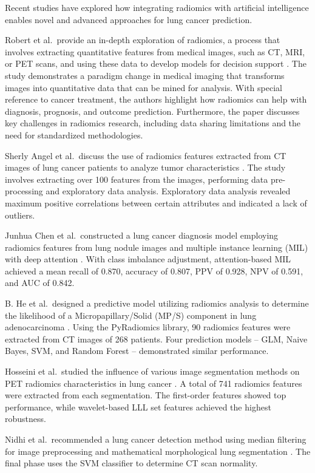 \documentclass{iopjournal}
\begin{document}
Recent studies have explored how integrating radiomics with artificial
intelligence enables novel and advanced approaches for lung cancer
prediction.

Robert et al.\ provide an in-depth exploration of radiomics, a process that
involves extracting quantitative features from medical images, such as CT, MRI,
or PET scans, and using these data to develop models for decision
support \cite{gillies2016radiomics}. The study demonstrates a paradigm change
in medical imaging that transforms images into quantitative data that can be
mined for analysis. With special reference to cancer treatment, the authors
highlight how radiomics can help with diagnosis, prognosis, and outcome
prediction. Furthermore, the paper discusses key challenges in radiomics
research, including data sharing limitations and the need for standardized
methodologies.

Sherly Angel et al.\ discuss the use of radiomics features extracted from CT
images of lung cancer patients to analyze tumor
characteristics \cite{nishanimath2021radiomics}. The study involves extracting
over 100 features from the images, performing data pre-processing and
exploratory data analysis. Exploratory data analysis revealed maximum positive
correlations between certain attributes and indicated a lack of outliers.

Junhua Chen et al.\ constructed a lung cancer diagnosis model employing
radiomics features from lung nodule images and multiple instance learning (MIL)
with deep attention \cite{chen2022lung}. With class imbalance adjustment,
attention-based MIL achieved a mean recall of 0.870, accuracy of 0.807, PPV of
0.928, NPV of 0.591, and AUC of 0.842.

B. He et al.\ designed a predictive model utilizing radiomics analysis to
determine the likelihood of a Micropapillary/Solid (MP/S) component in lung
adenocarcinoma \cite{he2021machine}. Using the PyRadiomics library, 90
radiomics features were extracted from CT images of 268 patients. Four
prediction models -- GLM, Naive Bayes, SVM, and Random Forest -- demonstrated
similar performance.

Hosseini et al.\ studied the influence of various image segmentation methods
on PET radiomics characteristics in lung cancer \cite{hosseini2021pet}. A total
of 741 radiomics features were extracted from each segmentation. The first-order
features showed top performance, while wavelet-based LLL set features achieved
the highest robustness.

Nidhi et al.\ recommended a lung cancer detection method using median filtering
for image preprocessing and mathematical morphological lung
segmentation \cite{nadkarni2019detection}. The final phase uses the SVM
classifier to determine CT scan normality.
\end{document}
